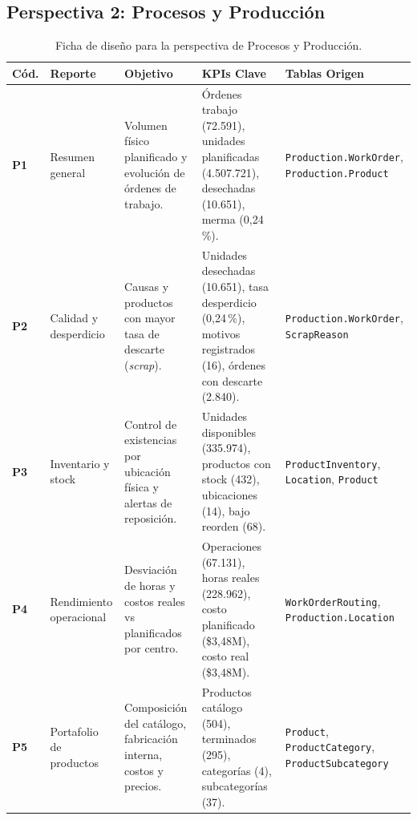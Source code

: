 \documentclass[11pt,letterpaper]{article}
\begin{document}
\subsection{Perspectiva 2: Procesos y Producción}
\begin{table}[H]
\centering
\small
\begin{tabularx}{\textwidth}{lp{3.2cm}p{4.2cm}Xp{2.8cm}}
\toprule
\textbf{Cód.} & \textbf{Reporte} & \textbf{Objetivo} & \textbf{KPIs Clave} & \textbf{Tablas Origen} \\
\midrule
\textbf{P1} & Resumen general & Volumen físico planificado y evolución de órdenes de trabajo. & Órdenes trabajo (72.591), unidades planificadas (4.507.721), desechadas (10.651), merma (0,24\,\%). & \texttt{Production.WorkOrder}, \texttt{Production.Product} \\
\addlinespace
\textbf{P2} & Calidad y desperdicio & Causas y productos con mayor tasa de descarte (\textit{scrap}). & Unidades desechadas (10.651), tasa desperdicio (0,24\,\%), motivos registrados (16), órdenes con descarte (2.840). & \texttt{Production.WorkOrder}, \texttt{ScrapReason} \\
\addlinespace
\textbf{P3} & Inventario y stock & Control de existencias por ubicación física y alertas de reposición. & Unidades disponibles (335.974), productos con stock (432), ubicaciones (14), bajo reorden (68). & \texttt{ProductInventory}, \texttt{Location}, \texttt{Product} \\
\addlinespace
\textbf{P4} & Rendimiento operacional & Desviación de horas y costos reales vs planificados por centro. & Operaciones (67.131), horas reales (228.962), costo planificado (\$3,48M), costo real (\$3,48M). & \texttt{WorkOrderRouting}, \texttt{Production.Location} \\
\addlinespace
\textbf{P5} & Portafolio de productos & Composición del catálogo, fabricación interna, costos y precios. & Productos catálogo (504), terminados (295), categorías (4), subcategorías (37). & \texttt{Product}, \texttt{ProductCategory}, \texttt{ProductSubcategory} \\
\bottomrule
\end{tabularx}
\caption{Ficha de diseño para la perspectiva de Procesos y Producción.}
\end{table}
\end{document}
